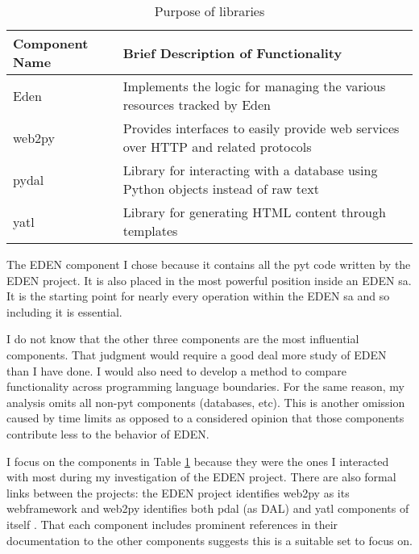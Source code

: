 \documentclass[a4paper,man,natbib,floatsintext]{apa6}
\begin{document}
  \begin{table}[ht]
  \caption{Purpose of libraries}
  \label{tab:table-1}
  \begin{tabular}{|l|p{}|}
  \hline
  Component Name & Brief Description of Functionality                                                 \\ \hline
  Eden           & Implements the logic for managing the various resources tracked by Eden            \\ \hline
  web2py         & Provides interfaces to easily provide web services over HTTP and related protocols \\ \hline
  pydal          & Library for interacting with a database using Python objects instead of raw text   \\ \hline
  yatl           & Library for generating HTML content through templates                              \\ \hline
  \end{tabular}
\end{table}
  
  The \gls{EDEN} component I chose because it contains all the \Gls{pyt} code written by the \gls{EDEN} project. It is also placed in the most powerful position inside an \gls{EDEN} \gls{sa}. It is the starting point for nearly every operation within the \gls{EDEN} \gls{sa} and so including it is essential.

  I do not know that the other three components are the most influential components. That judgment would require a good deal more study of \gls{EDEN} than I have done. I would also need to develop a method to compare functionality across programming language boundaries. For the same reason, my analysis omits all non-\Gls{pyt} components (databases, etc). This is another omission caused by time limits as opposed to a considered opinion that those components contribute less to the behavior of \gls{EDEN}. 

  I focus on the components in Table \ref{tab:table-1} because they were the ones I interacted with most during my investigation of the \gls{EDEN} project. There are also formal links between the projects: the \gls{EDEN} project identifies web2py as its \gls{webframework} and web2py identifies both pdal (as DAL) and yatl components of itself \citep{Di_Pierro2020-wn,Sahana_Foundation_undated-ww}. That each component includes prominent references in their documentation to the other components suggests this is a suitable set to focus on.
\end{document}
